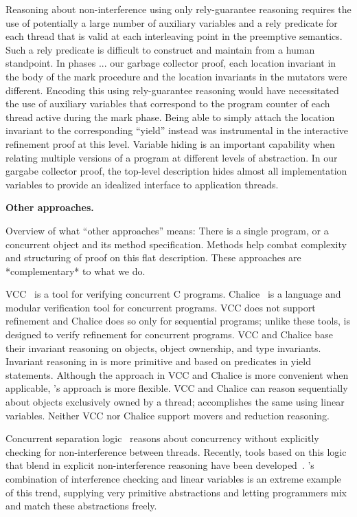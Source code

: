 {Reasoning about non-interference using only rely-guarantee reasoning requires the use of potentially a large number of auxiliary variables
and a rely predicate for each thread that is valid at each interleaving point in
the preemptive semantics. 
Such a rely predicate is difficult to construct and maintain from a
human standpoint.
In phases ... our garbage collector proof, each location invariant in
the body of the mark procedure and the location invariants in the
mutators were different. 
Encoding this using rely-guarantee reasoning would have necessitated
the use of auxiliary variables that correspond to the program counter
of each thread active during the mark phase. 
Being able to simply attach the location invariant to the
corresponding ``yield'' instead was instrumental in the interactive
refinement proof at this level. 
Variable hiding
is an important capability when relating multiple versions of a
program at different levels of abstraction. 
In our gargabe collector
proof, the top-level description hides almost all implementation
variables to provide an idealized interface to application threads. 


{\bf Other approaches.}

Overview of what ``other approaches'' means: There is a single
program, or a concurrent object and its method specification. Methods
help combat complexity and structuring of proof on this flat
description. These approaches are *complementary* to what we do.

VCC~\cite{VCC} is a tool for verifying concurrent C programs.  
Chalice~\cite{LM09} is a language and modular verification tool for concurrent programs. 
VCC does not support refinement and Chalice does so only for sequential programs;
unlike these tools, \civl is designed to verify refinement for concurrent programs.  
VCC and Chalice base their invariant reasoning on objects, object ownership, and type invariants. 
Invariant reasoning in \civl is more primitive and based on predicates in yield statements. 
Although the approach in VCC and Chalice is more convenient when applicable, \civl's approach is more flexible. 
VCC and Chalice can reason sequentially about objects exclusively owned by a thread;
\civl accomplishes the same using linear variables.
Neither VCC nor Chalice support movers and reduction reasoning.

Concurrent separation logic~\cite{OHearn07} reasons about concurrency without 
explicitly checking for non-interference between threads. 
Recently, tools based on this logic that blend in explicit non-interference reasoning have been developed~\cite{SAGL,RGSep}. 
\civl's combination of interference checking and linear variables is an extreme example of this trend,
supplying very primitive abstractions and letting programmers mix and
match these abstractions freely.

}
